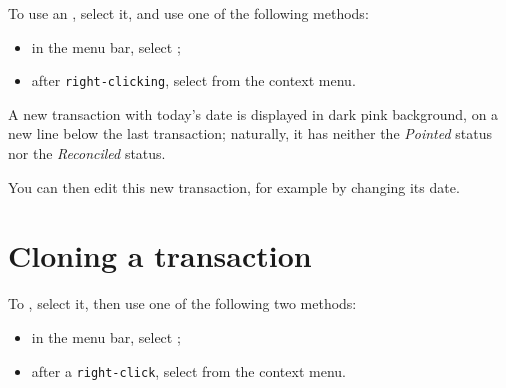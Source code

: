 To use an , select it, and use one of the following methods:
\begin{itemize}
	\item in the menu bar, select ;
	\item after \texttt{right-clicking}, select  from the context menu.
\end{itemize}

A new transaction with today's date is displayed in \colorbox[RGB]{245,155,155}{dark pink background}, on a new line below the last transaction; naturally, it has neither the \emph{Pointed} status nor the \emph{Reconciled} status.

You can then edit this new transaction, for example by changing its date.


\section{Cloning a transaction\label{transactions-duplicate}}

To , select it, then use one of the following two methods:
\begin{itemize}
	\item in the menu bar, select ;
	\item after a \texttt{right-click}, select  from the context menu.
\end{itemize}

